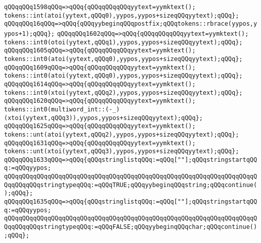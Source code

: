 \verb|qQQqqQQq1598qQQq=>qQQq{qQQqqQQqqQQqyytext=yymktext();|\newline
\verb|tokens::int(atoi(yytext,qQQq0),yypos,yypos+sizeqQQqyytext);qQQq};|\newline
\verb|qQQqqQQq16qQQq=>qQQq{qQQqyybeginqQQqpostfix;qQQqtokens::rbrace(yypos,yypos+1);qQQq};|\newline
\verb|qQQqqQQq1602qQQq=>qQQq{qQQqqQQqqQQqyytext=yymktext();|\newline
\verb|tokens::int0(otoi(yytext,qQQq1),yypos,yypos+sizeqQQqyytext);qQQq};|\newline
\verb|qQQqqQQq1605qQQq=>qQQq{qQQqqQQqqQQqyytext=yymktext();|\newline
\verb|tokens::int0(atoi(yytext,qQQq0),yypos,yypos+sizeqQQqyytext);qQQq};|\newline
\verb|qQQqqQQq1609qQQq=>qQQq{qQQqqQQqqQQqyytext=yymktext();|\newline
\verb|tokens::int0(atoi(yytext,qQQq0),yypos,yypos+sizeqQQqyytext);qQQq};|\newline
\verb|qQQqqQQq1614qQQq=>qQQq{qQQqqQQqqQQqyytext=yymktext();|\newline
\verb|tokens::int0(xtoi(yytext,qQQq2),yypos,yypos+sizeqQQqyytext);qQQq};|\newline
\verb|qQQqqQQq1620qQQq=>qQQq{qQQqqQQqqQQqyytext=yymktext();|\newline
\verb|tokens::int0(multiword_int::(-_)(xtoi(yytext,qQQq3)),yypos,yypos+sizeqQQqyytext);qQQq};|\newline
\verb|qQQqqQQq1625qQQq=>qQQq{qQQqqQQqqQQqyytext=yymktext();|\newline
\verb|tokens::unt(atoi(yytext,qQQq2),yypos,yypos+sizeqQQqyytext);qQQq};|\newline
\verb|qQQqqQQq1631qQQq=>qQQq{qQQqqQQqqQQqyytext=yymktext();|\newline
\verb|tokens::unt(xtoi(yytext,qQQq3),yypos,yypos+sizeqQQqyytext);qQQq};|\newline
\verb|qQQqqQQq1633qQQq=>qQQq{qQQqstringlistqQQq:=qQQq[""];qQQqstringstartqQQq:=qQQqyypos;|\newline
\verb|qQQqqQQqqQQqqQQqqQQqqQQqqQQqqQQqqQQqqQQqqQQqqQQqqQQqqQQqqQQqqQQqqQQqqQQqqQQqqQQqstringtypeqQQq:=qQQqTRUE;qQQqyybeginqQQqstring;qQQqcontinue();qQQq};|\newline
\verb|qQQqqQQq1635qQQq=>qQQq{qQQqstringlistqQQq:=qQQq[""];qQQqstringstartqQQq:=qQQqyypos;|\newline
\verb|qQQqqQQqqQQqqQQqqQQqqQQqqQQqqQQqqQQqqQQqqQQqqQQqqQQqqQQqqQQqqQQqqQQqqQQqqQQqqQQqstringtypeqQQq:=qQQqFALSE;qQQqyybeginqQQqchar;qQQqcontinue();qQQq};|\newline
